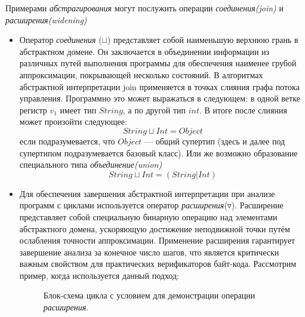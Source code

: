 Примерами \textit{абстрагирования} могут послужить операции \textit{соединения(join)} и \textit{расширения(widening)}
\begin{itemize}
    \item Оператор \textit{соединения} ($\sqcup$) представляет собой наименьшую
        верхнюю грань в абстрактном домене. Он
        заключается в объединении информации из различных путей выполнения
        программы для обеспечения наименее грубой аппроксимации,
        покрывающей несколько состояний. В алгоритмах абстрактной интерпретации join
        применяется в точках слияния графа потока управления. Программно это может выражаться в следующем: в одной ветке
        регистр $v_1$ имеет тип $String$, а по другой тип $int$. В итоге после слияния может произойти следующее:
        $$String \sqcup Int = Object$$ если подразумевается, что $Object$ — общий супертип (здесь и далее под 
        супертипом подразумевается базовый класс). Или же возможно образование специального типа \textit{объединение(union)}
        $$String \sqcup Int = (String | Int)$$
    \item Для обеспечения завершения абстрактной интерпретации при анализе программ
        с циклами используется оператор \textit{расширения}($\triangledown$). Расширение представляет собой
        специальную бинарную операцию над элементами абстрактного домена,
        ускоряющую достижение неподвижной точки путём ослабления точности
        аппроксимации. Применение расширения гарантирует завершение анализа за
        конечное число шагов, что является критически важным свойством для
        практических верификаторов байт-кода. Рассмотрим пример, когда используется данный подход:
    
\begin{figure}[H]
\centering
{}
\caption{Блок-схема цикла с условием для демонстрации операции \textit{расширения}.} 
\label{fig:cycle}
\end{figure}
\end{itemize}

